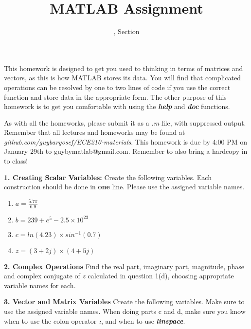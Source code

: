 \documentclass[11pt]{article}
\title{MATLAB Assignment \Homework}
\author{\Session, Section \Section}
\date{}
\makeatletter
\def\MyEmail{guybymatlab@gmail.com}
\def\DateOfSubmission{January 29th }
\newenvironment{qparts}{\begin{enumerate}[{(}a{)}]}{\end{enumerate}}
\makeatother
\begin{document}
\maketitle
This homework is designed to get you used to thinking in terms of
matrices and vectors, as this is how MATLAB stores its data. 
You will find that complicated operations can be resolved by one 
to two lines of code if you use the correct function and store data 
in the appropriate form.
The other purpose of this homework is to get you comfortable
with using the \textbf{\textit{help}} and \textbf{\textit{doc}} functions.

As with all the homeworks, please submit it as a \textit{.m} file, 
with suppressed output.
Remember that all lectures and homeworks may be found at 
\textit{github.com/guybaryosef/ECE210-materials}.
This homework is due by 4:00 PM on \DateOfSubmission to \MyEmail.
Remember to also bring a hardcopy in to class! 
\newline

\noindent \textbf{1. Creating Scalar Variables:} 
Create the following variables. 
Each construction should be done in \textbf{one} line.
Please use the assigned variable names. 
\begin{qparts}
\item
$ a = \frac{5.7 \pi}{6.9} $
\item 
$ b = 239+e^5 - 2.5 \times 10^{23}$
\item
$ c = ln(4.23) \times sin^{-1}(0.7)$
\item 
$ z = (3+2j) \times (4+5j) $

\end{qparts}

\noindent 
\newline
\textbf{2. Complex Operations} 
Find the real part, imaginary part, magnitude, 
phase and complex conjugate of $z$ calculated in question 1(d),
choosing appropriate variable names for each.

\noindent 
\newline
\textbf{3. Vector and Matrix Variables} 
Create the following variables. 
Make sure to use the assigned variable names. 
When doing parts c and d, 
make sure you know when to use the colon operator \textbf{\textit{:}},
and when to use \textbf{\textit{linspace}}. 
\end{document}
